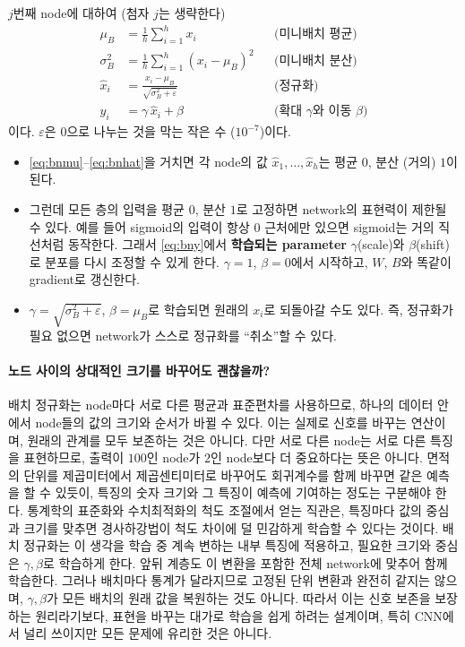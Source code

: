 \documentclass[11pt,a4paper]{article}
\begin{document}
$j$번째 node에 대하여 (첨자 $j$는 생략한다)
\begin{align}
\mu_B &= \frac1h\sum_{i=1}^{h}x_i
&& \text{(미니배치 평균)}\label{eq:bnmu}\\
\sigma_B^2 &= \frac1h\sum_{i=1}^{h}(x_i-\mu_B)^2
&& \text{(미니배치 분산)}\label{eq:bnvar}\\
\hat x_i &= \frac{x_i-\mu_B}{\sqrt{\sigma_B^2+\varepsilon}}
&& \text{(정규화)}\label{eq:bnhat}\\
y_i &= \gamma\,\hat x_i+\beta
&& \text{(확대 $\gamma$와 이동 $\beta$)}\label{eq:bny}
\end{align}
이다. $\varepsilon$은 $0$으로 나누는 것을 막는 작은 수 ($10^{-7}$)이다.

\begin{itemize}[leftmargin=1.8em]
\item \eqref{eq:bnmu}--\eqref{eq:bnhat}을 거치면 각 node의 값 $\hat x_1,\ldots,\hat x_h$는
평균 $0$, 분산 (거의) $1$이 된다.
\item 그런데 모든 층의 입력을 평균 $0$, 분산 $1$로 고정하면 network의 표현력이 제한될 수 있다.
예를 들어 sigmoid의 입력이 항상 $0$ 근처에만 있으면 sigmoid는 거의 직선처럼 동작한다.
그래서 \eqref{eq:bny}에서 \textbf{학습되는 parameter} $\gamma$(scale)와 $\beta$(shift)로 분포를 다시 조정할 수 있게 한다.
$\gamma=1$, $\beta=0$에서 시작하고, $W$, $B$와 똑같이 gradient로 갱신한다.
\item $\gamma=\sqrt{\sigma_B^2+\varepsilon}$, $\beta=\mu_B$로 학습되면 원래의 $x_i$로 되돌아갈 수도 있다.
즉, 정규화가 필요 없으면 network가 스스로 정규화를 ``취소''할 수 있다.
\end{itemize}



\paragraph{노드 사이의 상대적인 크기를 바꾸어도 괜찮을까?}
배치 정규화는 node마다 서로 다른 평균과 표준편차를 사용하므로, 하나의 데이터 안에서 node들의 값의 크기와 순서가 바뀔 수 있다. 이는 실제로 신호를 바꾸는 연산이며, 원래의 관계를 모두 보존하는 것은 아니다. 다만 서로 다른 node는 서로 다른 특징을 표현하므로, 출력이 $100$인 node가 $2$인 node보다 더 중요하다는 뜻은 아니다. 면적의 단위를 제곱미터에서 제곱센티미터로 바꾸어도 회귀계수를 함께 바꾸면 같은 예측을 할 수 있듯이, 특징의 숫자 크기와 그 특징이 예측에 기여하는 정도는 구분해야 한다. 통계학의 표준화와 수치최적화의 척도 조절에서 얻는 직관은, 특징마다 값의 중심과 크기를 맞추면 경사하강법이 척도 차이에 덜 민감하게 학습할 수 있다는 것이다. 배치 정규화는 이 생각을 학습 중 계속 변하는 내부 특징에 적용하고, 필요한 크기와 중심은 $\gamma,\beta$로 학습하게 한다. 앞뒤 계층도 이 변환을 포함한 전체 network에 맞추어 함께 학습한다. 그러나 배치마다 통계가 달라지므로 고정된 단위 변환과 완전히 같지는 않으며, $\gamma,\beta$가 모든 배치의 원래 값을 복원하는 것도 아니다. 따라서 이는 신호 보존을 보장하는 원리라기보다, 표현을 바꾸는 대가로 학습을 쉽게 하려는 설계이며, 특히 CNN에서 널리 쓰이지만 모든 문제에 유리한 것은 아니다.
\end{document}

